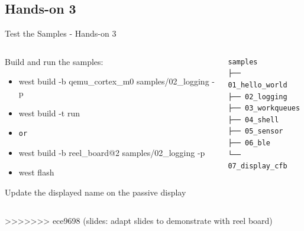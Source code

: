 \documentclass[10pt, aspectratio=169]{beamer}
\begin{document}
\subsection{Hands-on 3}
\begin{frame}[fragile]{Test the Samples - Hands-on 3}
  \begin{columns}
    \begin{column}{0.6\textwidth}
      Build and run the samples\footnotemark:
      \begin{itemize}
        \item \scriptsize west build -b qemu\_cortex\_m0 samples/02\_logging -p
        \item \scriptsize west build -t run
	\item \scriptsize \texttt{or}
        \item \scriptsize west build -b reel\_board@2 samples/02\_logging -p
        \item \scriptsize west flash
      \end{itemize}
      Update the displayed name on the passive display
    \end{column}
    \begin{column}{0.4\textwidth}
        {\fontsize{7}{7}\selectfont
          \begin{verbatim}
samples
├── 01_hello_world
├── 02_logging
├── 03_workqueues
├── 04_shell
├── 05_sensor
├── 06_ble
└── 07_display_cfb
        \end{verbatim}
      }
    \end{column}
  \end{columns}
>>>>>>> ece9698 (slides: adapt slides to demonstrate with reel board)
\end{frame}
\end{document}

